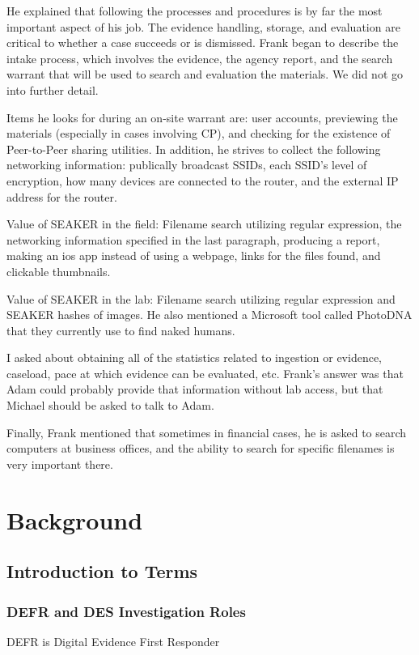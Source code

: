 \documentclass[12pt]{article}
\begin{document}
He explained that following the processes and procedures is by far the most important aspect of his job.  The
evidence handling, storage, and evaluation are critical to whether a case succeeds or is dismissed. Frank
began to describe the intake process, which involves the evidence, the agency report, and the search warrant
that will be used to search and evaluation the materials.  We did not go into further detail.

Items he looks for during an on-site warrant are: user accounts, previewing the materials (especially in
cases involving CP), and checking for the existence of Peer-to-Peer sharing utilities.  In addition, he 
strives to collect the following networking information: publically broadcast SSIDs, each SSID's level of
encryption, how many devices are connected to the router, and the external IP address for the router.

Value of SEAKER in the field: Filename search utilizing regular expression, the networking information 
specified in the last paragraph, producing a report, making an ios app instead of using a webpage, links
for the files found, and clickable thumbnails.

Value of SEAKER in the lab: Filename search utilizing regular expression and SEAKER hashes of images.  He
also mentioned a Microsoft tool called PhotoDNA that they currently use to find naked humans.

I asked about obtaining all of the statistics related to ingestion or evidence, caseload, pace at which
evidence can be evaluated, etc.  Frank's answer was that Adam could probably provide that information
without lab access, but that Michael should be asked to talk to Adam.

Finally, Frank mentioned that sometimes in financial cases, he is asked to search computers at business
offices, and the ability to search for specific filenames is very important there.

\newpage
\section{Background}
\label{sect-background}

\subsection{Introduction to Terms}
\vspace{0.5 cm}
\subsubsection{DEFR and DES Investigation Roles}
\vspace{0.5 cm}
DEFR is Digital Evidence First Responder\\
\end{document}
